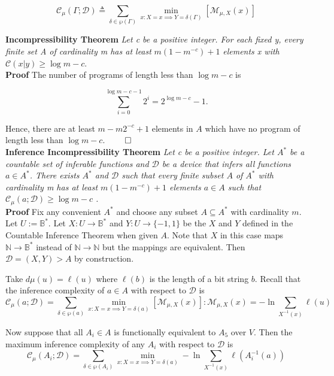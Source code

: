 \documentclass[11pt]{article}
\newcommand{\N}{\mathbb{N}}
\newcommand{\B}{\mathbb{B}}
\begin{document}
$$ \mathcal{C}_{\mu}(\Gamma ; \mathcal{D}) \triangleq \sum_{\delta \in \wp(\Gamma)} \min_{x : X = x \implies Y = \delta(\Gamma) } [\mathcal{M}_{\mu, X} (x)]	$$ 

\bigskip
\textbf{Incompressibility Theorem} \quad \textit{Let c be a positive integer. For each fixed y, every finite set A of cardinality m has at least} $ m(1 - m^{-c}) + 1 $ \textit{elements x with} $ \mathcal{C}(x|y) \geq \log m - c $. \\
\textbf{Proof} \quad The number of programs of length less than $ \log m - c $ is 

$$ \sum_{i = 0}^{\log m - c - 1} {2^i} = 2^{\log m - c} - 1. $$

Hence, there are at least $ m - m2^{-c} + 1 $ elements in $ A $ which have no program of length less than $ \log m - c $. $ \hfill \qed $ \\


\newpage
\bigskip
\textbf{Inference Incompressibility Theorem} \quad \textit{Let c be a positive integer. Let $ A^{*} $ be a countable set of inferable functions and $ \mathcal{D} $ be a device that infers all functions $ a \in A^{*} $. There exists $ A^{*} $ and $ \mathcal{D} $ such that every finite subset $ A $ of $ A^{*} $ with cardinality m has at least $ m(1 - m^{-c}) + 1 $ elements $ a \in A $ such that $ \mathcal{C}_{\mu}(a;\mathcal{D}) \geq \log m - c $ .} \\

\textbf{Proof} \quad Fix any convenient $ A^{*} $ and choose any subset $ A \subseteq A^{*} $ with cardinality $ m $. Let $ U := \B^{*} $. Let $ X: U \rightarrow \B^{*} $ and $ Y:U \rightarrow \{-1, 1\} $ be the $ X $ and $ Y $ defined in the Countable Inference Theorem when given $ A $. Note that $ X $ in this case maps $ \N \rightarrow \B^{*} $ instead of $ \N \rightarrow \N $ but the mappings are equivalent. Then $ \mathcal{D} = (X, Y) > A $ by construction.

\bigskip
Take $ d\mu(u) = \ell(u) $ where $ \ell(b) $ is the length of a bit string $ b $. Recall that the inference complexity of $ a \in A $ with respect to $ \mathcal{D} $ is
$$ \mathcal{C}_{\mu}(a ; \mathcal{D}) = \sum_{\delta \in \wp(a)} \min_{x : X = x \implies Y = \delta(a) } [\mathcal{M}_{\mu, X} (x)]: \mathcal{M}_{\mu, X} (x) = - \ln \sum_{X^{-1}(x)} {\ell(u)} $$

Now suppose that all $ A_i \in A $ is functionally equivalent to $ A_5 $ over $ V $. Then the maximum inference complexity of any $ A_i $ with respect to $ \mathcal{D} $ is
$$ \mathcal{C}_{\mu}(A_i ; \mathcal{D}) = \sum_{\delta \in \wp(A_i)} \min_{x : X = x \implies Y = \delta(a) } -\ln \sum_{X^{-1}(x)} {\ell(A_i^{-1}(a))} $$
\end{document}
